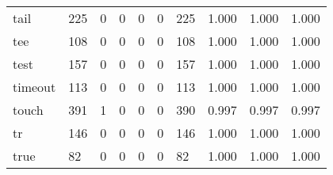 \begin{longtable}{lp{2.0cm}p{2.0cm}p{2.0cm}p{2.0cm}p{2.0cm}p{2.0cm}p{2.0cm}p{2.0cm}p{2.0cm}}
tail      &                    225 &                                  0 &                                 0 &                                0 &                                 0 &                             225 &                                1.000 &                                  1.000 &                                1.000 \\
tee       &                    108 &                                  0 &                                 0 &                                0 &                                 0 &                             108 &                                1.000 &                                  1.000 &                                1.000 \\
test      &                    157 &                                  0 &                                 0 &                                0 &                                 0 &                             157 &                                1.000 &                                  1.000 &                                1.000 \\
timeout   &                    113 &                                  0 &                                 0 &                                0 &                                 0 &                             113 &                                1.000 &                                  1.000 &                                1.000 \\
touch     &                    391 &                                  1 &                                 0 &                                0 &                                 0 &                             390 &                                0.997 &                                  0.997 &                                0.997 \\
tr        &                    146 &                                  0 &                                 0 &                                0 &                                 0 &                             146 &                                1.000 &                                  1.000 &                                1.000 \\
true      &                     82 &                                  0 &                                 0 &                                0 &                                 0 &                              82 &                                1.000 &                                  1.000 &                                1.000 \\

\end{longtable}

